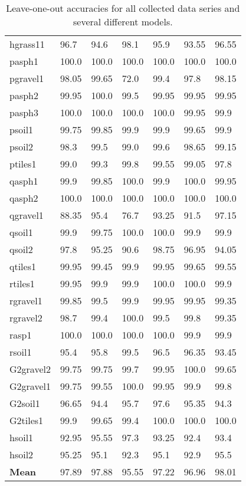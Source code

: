 \begin{table}
\begin{center}
\begin{tabular}{|l|l|l|l|l|l|l|}
		hgrass11 & 96.7 & \cellcolor{red!20}94.6 & 98.1 & 95.9 & \cellcolor{red!20}93.55 & 96.55\\
		pasph1 & 100.0 & 100.0 & 100.0 & 100.0 & 100.0 & 100.0\\
		pgravel1 & 98.05 & 99.65 & \cellcolor{red!20}72.0 & 99.4 & 97.8 & 98.15\\
		pasph2 & 99.95 & 100.0 & 99.5 & 99.95 & 99.95 & 99.95\\
		pasph3 & 100.0 & 100.0 & 100.0 & 100.0 & 99.95 & 99.9\\
		psoil1 & 99.75 & 99.85 & 99.9 & 99.9 & 99.65 & 99.9\\
		psoil2 & 98.3 & 99.5 & 99.0 & 99.6 & 98.65 & 99.15\\
		ptiles1 & 99.0 & 99.3 & 99.8 & 99.55 & 99.05 & 97.8\\
		qasph1 & 99.9 & 99.85 & 100.0 & 99.9 & 100.0 & 99.95\\
		qasph2 & 100.0 & 100.0 & 100.0 & 100.0 & 100.0 & 100.0\\
		qgravel1 & \cellcolor{red!20}88.35 & 95.4 & \cellcolor{red!20}76.7 & \cellcolor{red!20}93.25 & \cellcolor{red!20}91.5 & 97.15\\
		qsoil1 & 99.9 & 99.75 & 100.0 & 100.0 & 99.9 & 99.9\\
		qsoil2 & 97.8 & 95.25 & \cellcolor{red!20}90.6 & 98.75 & 96.95 & \cellcolor{red!20}94.05\\
		qtiles1 & 99.95 & 99.45 & 99.9 & 99.95 & 99.65 & 99.55\\
		rtiles1 & 99.95 & 99.9 & 99.9 & 100.0 & 100.0 & 99.9\\
		rgravel1 & 99.85 & 99.5 & 99.9 & 99.95 & 99.95 & 99.35\\
		rgravel2 & 98.7 & 99.4 & 100.0 & 99.5 & 99.8 & 99.35\\
		rasp1 & 100.0 & 100.0 & 100.0 & 100.0 & 99.9 & 99.9\\
		rsoil1 & 95.4 & 95.8 & 99.5 & 96.5 & 96.35 & \cellcolor{red!20}93.45\\
		G2gravel2 & 99.75 & 99.75 & 99.7 & 99.95 & 100.0 & 99.65\\
		G2gravel1 & 99.75 & 99.55 & 100.0 & 99.95 & 99.9 & 99.8\\
		G2soil1 & 96.65 & \cellcolor{red!20}94.4 & 95.7 & 97.6 & 95.35 & \cellcolor{red!20}94.3\\
		G2tiles1 & 99.9 & 99.65 & 99.4 & 100.0 & 100.0 & 100.0\\
		hsoil1 & \cellcolor{red!20}92.95 & 95.55 & 97.3 & \cellcolor{red!20}93.25 & \cellcolor{red!20}92.4 & \cellcolor{red!20}93.4\\
		hsoil2 & 95.25 & 95.1 & \cellcolor{red!20}92.3 & 95.1 & \cellcolor{red!20}92.9 & 95.5\\
		\hline
		\textbf{Mean} & 97.89 & 97.88 & 95.55 & 97.22 & 96.96 & 98.01\\
		\hline
		\end{tabular}
	\end{center}
	\label{tab:loo}
	\caption{Leave-one-out accuracies for all collected data series and several different models.}
\end{table}

